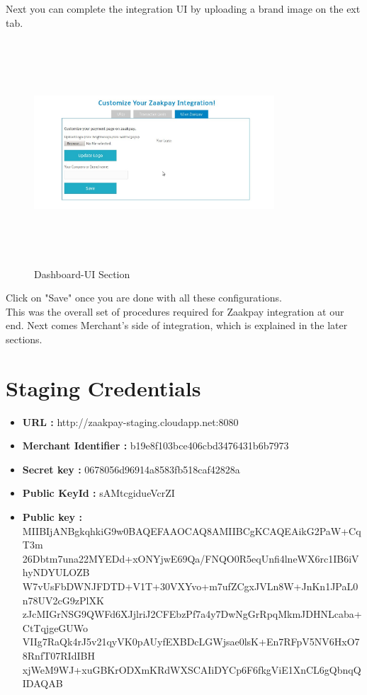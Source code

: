 \documentclass{article}
\begin{document}
Next you can complete the integration UI by uploading a brand image on the ext tab.

\begin{figure}[H]
\centering
\caption{Dashboard-UI Section}
\includegraphics[width=0.8\textwidth,height=3.3in]{Zaakpay_ui.png}
\end{figure}
Click on "Save" once you are done with all these configurations.
\\

This was the overall set of procedures required for Zaakpay integration at our end. Next comes Merchant's side of integration, which is explained in the later sections.
\newpage
\section{Staging Credentials}
\begin{itemize}
\item {\bfseries URL : } http://zaakpay-staging.cloudapp.net:8080
\item {\bfseries Merchant Identifier :} b19e8f103bce406cbd3476431b6b7973
\item {\bfseries Secret key :} 0678056d96914a8583fb518caf42828a
\item {\bfseries Public KeyId :}
sAMtcgidueVcrZI
\item {\bfseries Public key :} MIIBIjANBgkqhkiG9w0BAQEFAAOCAQ8AMIIBCgKCAQEAikG2PaW+CqT3m\\26Dbtm7una22MYEDd+xONYjwE69Qa/FNQO0R5eqUnfi4lneWX6rc1IB6iVhyNDYULOZB\\W7vUsFbDWNJFDTD+V1T+30VXYvo+m7ufZCgxJVLn8W+JnKn1JPaL0n78UV2cG9zPlXK\\zJcMIGrNSG9QWFd6XJjlriJ2CFEbzPf7a4y7DwNgGrRpqMkmJDHNLcaba+CtTqjgeGUWo\\VIIg7RaQk4rJ5v21qyVK0pAUyfEXBDcLGWjsae0lsK+En7RFpV5NV6HxO78RnfT07RIdIBH\\xjWeM9WJ+xuGBKrODXmKRdWXSCAIiDYCp6F6fkgViE1XnCL6gQbnqQIDAQAB
\end{itemize}
\end{document}
